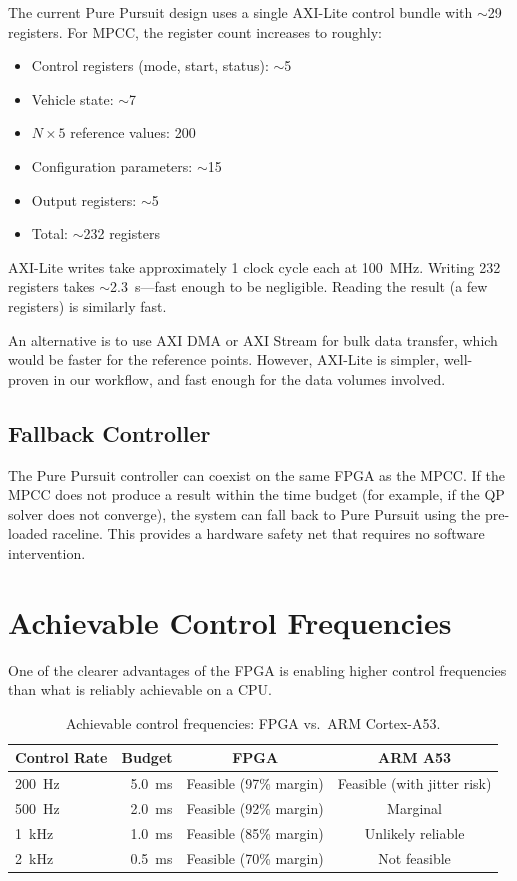 \documentclass[12pt,a4paper]{article}
\begin{document}
The current Pure Pursuit design uses a single AXI-Lite control bundle with $\sim$29 registers. For MPCC, the register count increases to roughly:
\begin{itemize}
    \item Control registers (mode, start, status): $\sim$5
    \item Vehicle state: $\sim$7
    \item $N \times 5$ reference values: 200
    \item Configuration parameters: $\sim$15
    \item Output registers: $\sim$5
    \item Total: $\sim$232 registers
\end{itemize}

AXI-Lite writes take approximately 1 clock cycle each at 100~MHz. Writing 232 registers takes $\sim$2.3~\textmu s---fast enough to be negligible. Reading the result (a few registers) is similarly fast.

An alternative is to use AXI DMA or AXI Stream for bulk data transfer, which would be faster for the reference points. However, AXI-Lite is simpler, well-proven in our workflow, and fast enough for the data volumes involved.

\subsection{Fallback Controller}

The Pure Pursuit controller can coexist on the same FPGA as the MPCC. If the MPCC does not produce a result within the time budget (for example, if the QP solver does not converge), the system can fall back to Pure Pursuit using the pre-loaded raceline. This provides a hardware safety net that requires no software intervention.

\section{Achievable Control Frequencies}

One of the clearer advantages of the FPGA is enabling higher control frequencies than what is reliably achievable on a CPU.

\begin{table}[H]
\centering
\begin{tabular}{lrcc}
\toprule
\textbf{Control Rate} & \textbf{Budget} & \textbf{FPGA} & \textbf{ARM A53} \\
\midrule
200~Hz & 5.0~ms & Feasible (97\% margin) & Feasible (with jitter risk) \\
500~Hz & 2.0~ms & Feasible (92\% margin) & Marginal \\
1~kHz & 1.0~ms & Feasible (85\% margin) & Unlikely reliable \\
2~kHz & 0.5~ms & Feasible (70\% margin) & Not feasible \\
\bottomrule
\end{tabular}
\caption{Achievable control frequencies: FPGA vs.\ ARM Cortex-A53.}
\end{table}
\end{document}
